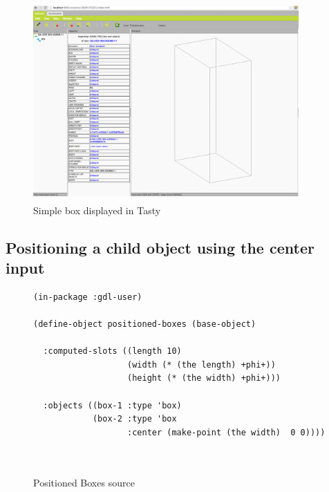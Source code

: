 \documentclass [11pt]{book}
\begin{document}
\begin{figure}
\begin{center}
\includegraphics[width=4in,height=3in]{../images/tasty-box-1.png}
\end{center}

\caption{Simple box displayed in Tasty}

\label{fig:tasty-box}

\end{figure}


\subsection{Positioning a child object using the center input}

\label{subsec:positioningachildobjectusingthecenterinput}

\begin{figure}\begin{lrbox}{\boxedverb}
\begin{minipage}{\linewidth}\begin{verbatim}(in-package :gdl-user)

(define-object positioned-boxes (base-object)

  :computed-slots ((length 10)
                   (width (* (the length) +phi+))
                   (height (* (the width) +phi+)))

  :objects ((box-1 :type 'box)
            (box-2 :type 'box 
                   :center (make-point (the width)  0 0))))
            
                 

\end{verbatim}\end{minipage}
\end{lrbox}
\fbox{\usebox{\boxedverb}}

\caption{Positioned Boxes source}

\label{fig:positioned-boxes-source}

\end{figure}
\end{document}
